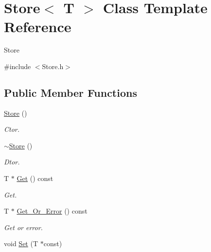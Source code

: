 \hypertarget{classStore}{
\section{Store$<$ T $>$ Class Template Reference}
\label{classStore}
}


Store  


{\ttfamily \#include $<$Store.h$>$}\subsection*{Public Member Functions}
\begin{DoxyCompactItemize}
\item 
\hypertarget{classStore_a3966b60e25e5b867c66f49059a20ff2a}{
\hyperlink{classStore_a3966b60e25e5b867c66f49059a20ff2a}{Store} ()}
\label{classStore_a3966b60e25e5b867c66f49059a20ff2a}

\begin{DoxyCompactList}\small\item\em Ctor. \item\end{DoxyCompactList}\item 
\hypertarget{classStore_aa8552abefd95eb950d405170cdd8ccd6}{
\hyperlink{classStore_aa8552abefd95eb950d405170cdd8ccd6}{$\sim$Store} ()}
\label{classStore_aa8552abefd95eb950d405170cdd8ccd6}

\begin{DoxyCompactList}\small\item\em Dtor. \item\end{DoxyCompactList}\item 
\hypertarget{classStore_ae8df207be267839855e8f24888e2f47a}{
T $\ast$ \hyperlink{classStore_ae8df207be267839855e8f24888e2f47a}{Get} () const }
\label{classStore_ae8df207be267839855e8f24888e2f47a}

\begin{DoxyCompactList}\small\item\em Get. \item\end{DoxyCompactList}\item 
\hypertarget{classStore_ad43bc878cb78463c87fb7cf8ae54b688}{
T $\ast$ \hyperlink{classStore_ad43bc878cb78463c87fb7cf8ae54b688}{Get\_\-Or\_\-Error} () const }
\label{classStore_ad43bc878cb78463c87fb7cf8ae54b688}

\begin{DoxyCompactList}\small\item\em Get or error. \item\end{DoxyCompactList}\item 
\hypertarget{classStore_a4e641c5d6246958b1049bcb4cd17757b}{
void \hyperlink{classStore_a4e641c5d6246958b1049bcb4cd17757b}{Set} (T $\ast$const)}
\label{classStore_a4e641c5d6246958b1049bcb4cd17757b}


\end{DoxyCompactItemize}
